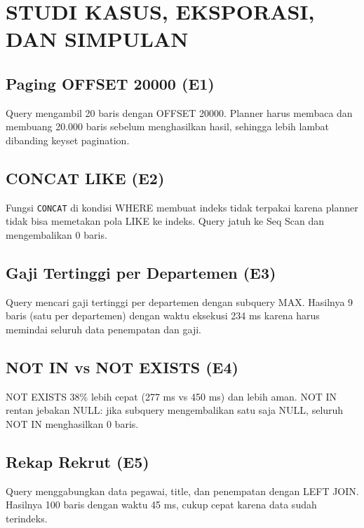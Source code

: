 \chapter{STUDI KASUS, EKSPORASI, DAN SIMPULAN}

\section{Paging OFFSET 20000 (E1)}
Query mengambil 20 baris dengan OFFSET 20000. Planner harus membaca dan membuang 20.000 baris sebelum menghasilkan hasil, sehingga lebih lambat dibanding keyset pagination.


\section{CONCAT LIKE (E2)}
Fungsi \texttt{CONCAT} di kondisi WHERE membuat indeks tidak terpakai karena planner tidak bisa memetakan pola LIKE ke indeks. Query jatuh ke Seq Scan dan mengembalikan 0 baris.


\section{Gaji Tertinggi per Departemen (E3)}
Query mencari gaji tertinggi per departemen dengan subquery MAX. Hasilnya 9 baris (satu per departemen) dengan waktu eksekusi 234 ms karena harus memindai seluruh data penempatan dan gaji.


\section{NOT IN vs NOT EXISTS (E4)}
NOT EXISTS 38\% lebih cepat (277 ms vs 450 ms) dan lebih aman. NOT IN rentan jebakan NULL: jika subquery mengembalikan satu saja NULL, seluruh NOT IN menghasilkan 0 baris.


\section{Rekap Rekrut (E5)}
Query menggabungkan data pegawai, title, dan penempatan dengan LEFT JOIN. Hasilnya 100 baris dengan waktu 45 ms, cukup cepat karena data sudah terindeks.

